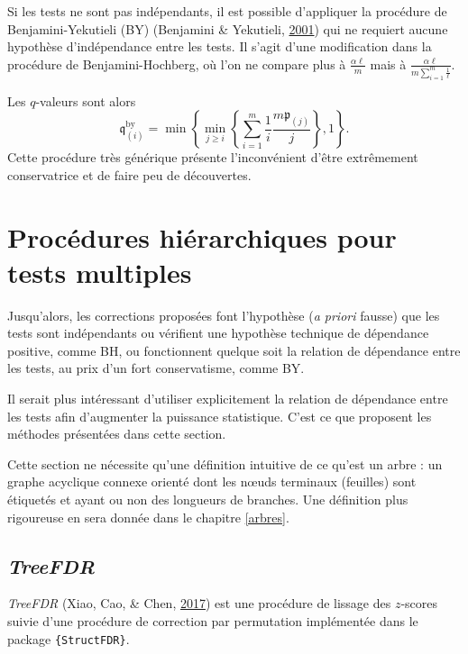 \documentclass[12pt,a4paper]{reedthesis}
\newcommand \pv {\mathfrak{p}}
\newcommand \qv {\mathfrak{q}}
\theoremstyle{definition}
\theoremstyle{definition}
\theoremstyle{definition}
\theoremstyle{remark}
\begin{document}
Si les tests ne sont pas indépendants, il est possible d'appliquer la procédure de Benjamini-Yekutieli (BY) (Benjamini \& Yekutieli, \protect\hyperlink{ref-benjamini2001control}{2001}) qui ne requiert aucune hypothèse d'indépendance entre les tests. Il s'agit d'une modification dans la procédure de Benjamini-Hochberg, où l'on ne compare plus à \(\frac{\alpha\ell}{m}\) mais à \(\frac{\alpha\ell}{m\sum_{i = 1}^m \frac{1}{\ell}}\).

Les \(q\)-valeurs sont alors
\begin{equation*}
\qv^{\text{by}}_{(i)} = \min\left\{\min_{j\ge i}\left\{\sum_{i = 1}^m \frac{1}{i} \frac{ m\pv_{(j)}}{j}\right\},1\right\}.
\end{equation*}
Cette procédure très générique présente l'inconvénient d'être extrêmement conservatrice et de faire peu de découvertes.

\hypertarget{procuxe9dures-hiuxe9rarchiques-pour-tests-multiples}{%
\section{Procédures hiérarchiques pour tests multiples}\label{procuxe9dures-hiuxe9rarchiques-pour-tests-multiples}}

Jusqu'alors, les corrections proposées font l'hypothèse (\emph{a priori} fausse) que les tests sont indépendants ou vérifient une hypothèse technique de dépendance positive, comme BH, ou fonctionnent quelque soit la relation de dépendance entre les tests, au prix d'un fort conservatisme, comme BY.

Il serait plus intéressant d'utiliser explicitement la relation de dépendance entre les tests afin d'augmenter la puissance statistique. C'est ce que proposent les méthodes présentées dans cette section.

Cette section ne nécessite qu'une définition intuitive de ce qu'est un arbre : un graphe acyclique connexe orienté dont les nœuds terminaux (feuilles) sont étiquetés et ayant ou non des longueurs de branches. Une définition plus rigoureuse en sera donnée dans le chapitre \ref{arbres}.

\hypertarget{treefdr}{%
\subsection{\texorpdfstring{\emph{TreeFDR}}{TreeFDR}}\label{treefdr}}

\emph{TreeFDR} (Xiao, Cao, \& Chen, \protect\hyperlink{ref-xiao2017false}{2017}) est une procédure de lissage des \(z\)-scores suivie d'une procédure de correction par permutation implémentée dans le package \texttt{\{StructFDR\}}.
\end{document}
